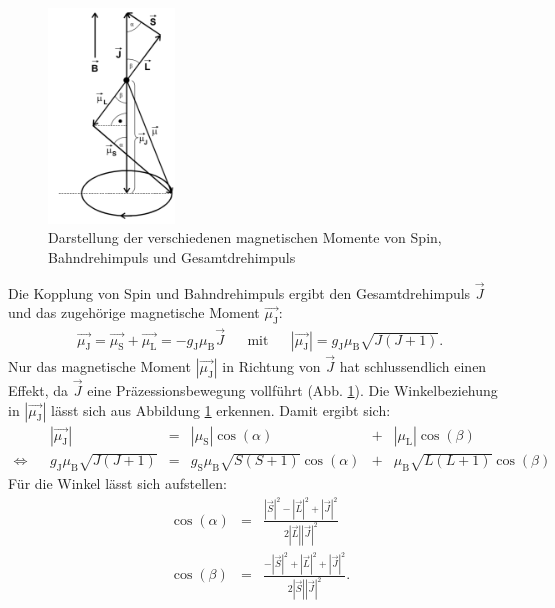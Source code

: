 \begin{figure}[h!]
  \centering
  \includegraphics[width=0.3\textwidth]{magmom1.png}
  \caption{Darstellung der verschiedenen magnetischen Momente von Spin, Bahndrehimpuls und Gesamtdrehimpuls \cite{1}}
  \label{fig:magmom}
\end{figure}
Die Kopplung von Spin und Bahndrehimpuls ergibt den Gesamtdrehimpuls $\vec{J}$ und das zugehörige magnetische Moment $\vec{\mu_{\text{J}}}$:
\begin{align*}
  \vec{\mu_{\text{J}}} = \vec{\mu_{\text{S}}} + \vec{\mu_{\text{L}}}= - g_{\text{J}} \mu_{\text{B}} \vec{J} && \text{mit} && |\vec{\mu_{\text{J}}}|=  g_{\text{J}} \mu_{\text{B}} \sqrt{J(J+1)}.
\end{align*}
Nur das magnetische Moment $|\vec{\mu_{\text{J}}}|$ in Richtung von $\vec{J}$ hat schlussendlich einen Effekt, da $\vec{J}$ eine Präzessionsbewegung vollführt (Abb. \ref{fig:magmom}).
Die Winkelbeziehung in $|\vec{\mu_{\text{J}}}|$ lässt sich aus Abbildung \ref{fig:magmom} erkennen.
Damit ergibt sich:
\begin{align*}
                  && |\vec{\mu_{\text{J}}}|  &=&  |\mu_{\text{S}}| \cos{(\alpha)} &+& |\mu_{\text{L}}| \cos{(\beta)} \\
 \Leftrightarrow  && g_{\text{J}} \mu_{\text{B}} \sqrt{J(J+1)} &=& g_{\text{S}} \mu_{\text{B}} \sqrt{S(S+1)} \cos{(\alpha)} &+& \mu_{\text{B}} \sqrt{L(L+1)} \cos{(\beta)}
\end{align*}
Für die Winkel lässt sich aufstellen:
\begin{align*}
  \cos{(\alpha)} &=& \frac{ |\vec{S}|^2 - |\vec{L}|^2 + |\vec{J}|^2}{2 |\vec{L}||\vec{J}|^2} \\%
  \cos{(\beta)}  &=& \frac{-|\vec{S}|^2 + |\vec{L}|^2 + |\vec{J}|^2}{2 |\vec{S}||\vec{J}|^2}.\\%
\end{align*}
